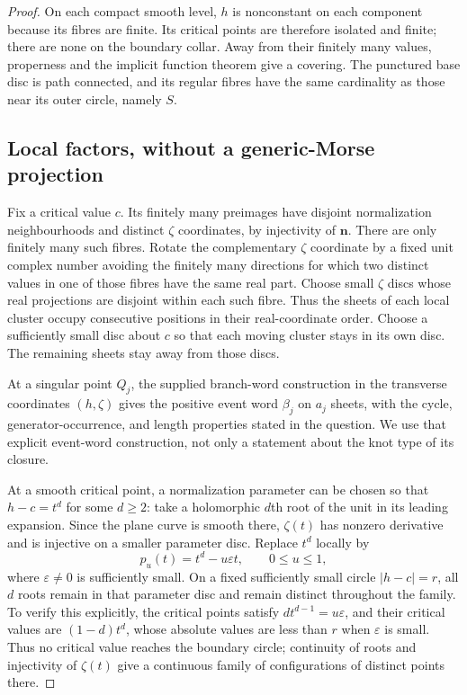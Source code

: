 \documentclass[11pt,a4paper]{article}
\theoremstyle{remark}
\begin{document}
\begin{proof}
On each compact smooth level, $h$ is nonconstant on each component
because its fibres are finite.  Its critical points are therefore
isolated and finite; there are none on the boundary collar.  Away from
their finitely many values, properness and the implicit function theorem
give a covering.  The punctured base disc is path connected, and its
regular fibres have the same cardinality as those near its outer circle,
namely $S$.

\subsection{Local factors, without a generic-Morse projection}

Fix a critical value $c$.  Its finitely many preimages have disjoint
normalization neighbourhoods and distinct $\zeta$ coordinates, by
injectivity of $\boldsymbol n$.  There are only finitely many such
fibres.  Rotate the complementary $\zeta$ coordinate by a fixed unit
complex number avoiding the finitely many directions for which two
distinct values in one of those fibres have the same real part.
Choose small $\zeta$ discs whose real projections are disjoint within
each such fibre.  Thus the sheets of each local cluster occupy
consecutive positions in their real-coordinate order.  Choose a sufficiently small
disc about $c$ so that each moving cluster stays in its own disc.  The
remaining sheets stay away from those discs.

At a singular point $Q_j$, the supplied branch-word construction in the
transverse coordinates $(h,\zeta)$ gives the positive event word
$\beta_j$ on $a_j$ sheets, with the cycle, generator-occurrence, and
length properties stated in the question.  We use that explicit
event-word construction, not only a statement about the knot type of
its closure.

At a smooth critical point, a normalization parameter can be chosen so
that $h-c=t^d$ for some $d\ge2$: take a holomorphic $d$th root of the
unit in its leading expansion.  Since the plane curve is smooth there,
$\zeta(t)$ has nonzero derivative and is injective on a smaller
parameter disc.  Replace $t^d$ locally by
\[
 p_u(t)=t^d-u\varepsilon t,\qquad 0\le u\le1,
\]
where $\varepsilon\ne0$ is sufficiently small.  On a fixed sufficiently
small circle $|h-c|=r$, all $d$ roots remain in that parameter disc and
remain distinct throughout the family.  To verify this explicitly,
the critical points satisfy $dt^{d-1}=u\varepsilon$, and their critical
values are $(1-d)t^d$, whose absolute values are less than $r$ when
$\varepsilon$ is small.  Thus no critical value reaches the boundary
circle; continuity of roots and injectivity of $\zeta(t)$ give a
continuous family of configurations of distinct points there.


\end{proof}
\end{document}

